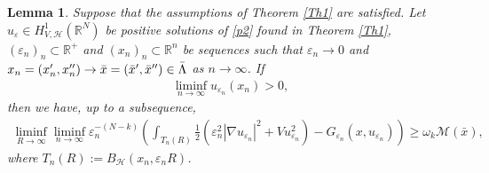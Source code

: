 \documentclass[a4paper]{amsart}
\newtheorem{lemma}[proposition]{Lemma}
\begin{document}
\begin{lemma}
Suppose that the assumptions of Theorem \ref{Th1} are satisfied. Let $u_{\varepsilon}\in H^1_{V,\mathcal{H}}({\mathbb{R}}^N)$ be
positive solutions of \eqref{p2} found in Theorem \ref{Th1}, $(\varepsilon_n)_n \subset {\mathbb{R}}^+$ and $(x_n)_n \subset
{\mathbb{R}}^n$ be sequences such that $\varepsilon_n \to 0$ and $x_n = (x'_n,x''_n) \to \bar{x} =
(\bar{x}',\bar{x}'') \in \Bar{\Lambda}$ as $n\to \infty$. If 
\begin{align}\label{estim:sup1}
 \liminf_{n\to\infty} u_{\varepsilon_n}(x_n) > 0,
\end{align}
then we have, up to a subsequence,
 \begin{align*}
 \liminf_{R\to\infty}\liminf_{n\to\infty} \varepsilon_n^{-(N-k)} \left( \int_{T_n(R)}  \frac{1}{2} \left( \varepsilon_n^2
{\left| {\nabla u_{\varepsilon_n}} \right|}^2 + V u_{\varepsilon_n}^2 \right) - G_{\varepsilon_n}(x,u_{\varepsilon_n}) \right) 
\geq \omega_k \mathcal{M}(\bar{x}),
 \end{align*}
where $T_n(R) := B_{\mathcal{H}}(x_n,\varepsilon_n R)$.
\end{lemma}
\end{document}
